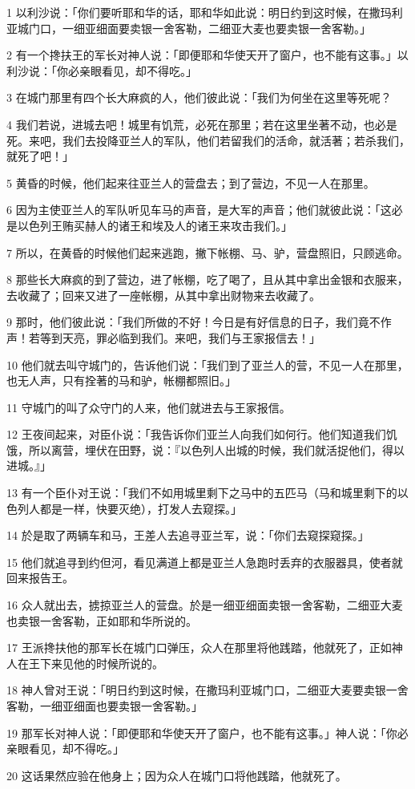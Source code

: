 \par 1 以利沙说：「你们要听耶和华的话，耶和华如此说：明日约到这时候，在撒玛利亚城门口，一细亚细面要卖银一舍客勒，二细亚大麦也要卖银一舍客勒。」
\par 2 有一个搀扶王的军长对神人说：「即便耶和华使天开了窗户，也不能有这事。」以利沙说：「你必亲眼看见，却不得吃。」
\par 3 在城门那里有四个长大麻疯的人，他们彼此说：「我们为何坐在这里等死呢？
\par 4 我们若说，进城去吧！城里有饥荒，必死在那里；若在这里坐著不动，也必是死。来吧，我们去投降亚兰人的军队，他们若留我们的活命，就活著；若杀我们，就死了吧！」
\par 5 黄昏的时候，他们起来往亚兰人的营盘去；到了营边，不见一人在那里。
\par 6 因为主使亚兰人的军队听见车马的声音，是大军的声音；他们就彼此说：「这必是以色列王贿买赫人的诸王和埃及人的诸王来攻击我们。」
\par 7 所以，在黄昏的时候他们起来逃跑，撇下帐棚、马、驴，营盘照旧，只顾逃命。
\par 8 那些长大麻疯的到了营边，进了帐棚，吃了喝了，且从其中拿出金银和衣服来，去收藏了；回来又进了一座帐棚，从其中拿出财物来去收藏了。
\par 9 那时，他们彼此说：「我们所做的不好！今日是有好信息的日子，我们竟不作声！若等到天亮，罪必临到我们。来吧，我们与王家报信去！」
\par 10 他们就去叫守城门的，告诉他们说：「我们到了亚兰人的营，不见一人在那里，也无人声，只有拴著的马和驴，帐棚都照旧。」
\par 11 守城门的叫了众守门的人来，他们就进去与王家报信。
\par 12 王夜间起来，对臣仆说：「我告诉你们亚兰人向我们如何行。他们知道我们饥饿，所以离营，埋伏在田野，说：『以色列人出城的时候，我们就活捉他们，得以进城。』」
\par 13 有一个臣仆对王说：「我们不如用城里剩下之马中的五匹马（马和城里剩下的以色列人都是一样，快要灭绝），打发人去窥探。」
\par 14 於是取了两辆车和马，王差人去追寻亚兰军，说：「你们去窥探窥探。」
\par 15 他们就追寻到约但河，看见满道上都是亚兰人急跑时丢弃的衣服器具，使者就回来报告王。
\par 16 众人就出去，掳掠亚兰人的营盘。於是一细亚细面卖银一舍客勒，二细亚大麦也卖银一舍客勒，正如耶和华所说的。
\par 17 王派搀扶他的那军长在城门口弹压，众人在那里将他践踏，他就死了，正如神人在王下来见他的时候所说的。
\par 18 神人曾对王说：「明日约到这时候，在撒玛利亚城门口，二细亚大麦要卖银一舍客勒，一细亚细面也要卖银一舍客勒。」
\par 19 那军长对神人说：「即便耶和华使天开了窗户，也不能有这事。」神人说：「你必亲眼看见，却不得吃。」
\par 20 这话果然应验在他身上；因为众人在城门口将他践踏，他就死了。

